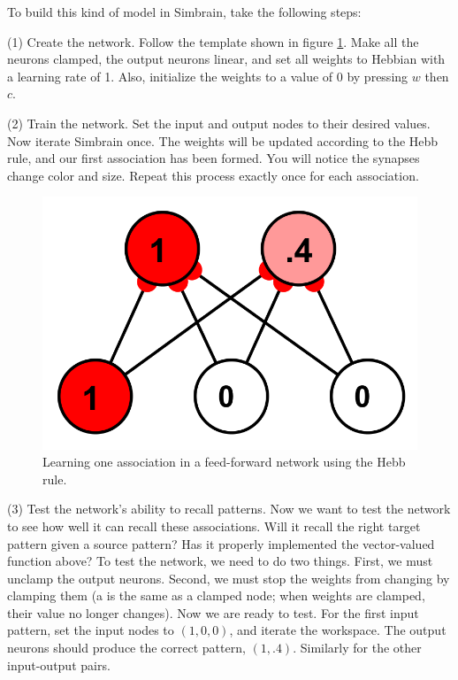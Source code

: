 To build this kind of model in Simbrain, take the following steps:

(1) Create the network. Follow the template shown in figure \ref{ffAssociator}. Make all the neurons clamped, the output neurons linear, and set all weights to Hebbian with a learning rate of 1. Also, initialize the weights to a value of 0 by pressing $w$ then $c$. 

(2) Train the network. Set the input and output nodes to their desired values. Now iterate Simbrain once. The weights will be updated according to the Hebb rule, and our first association has been formed. You will notice the synapses change color and size. Repeat this process exactly once for each association.

\begin{figure}[h]
\centering
\includegraphics[scale=.4]{./images/net-3-2.png}
\caption[Simbrain screenshot.]{Learning one association in a feed-forward network using the Hebb rule.}
\label{ffAssociator}
\end{figure}

(3) Test the network's ability to recall patterns.  Now we want to test the network to see how well it can recall these associations. Will it recall the right target pattern given a source pattern? Has it properly implemented the vector-valued function above?  To test the network, we need to do two things. First, we must unclamp the output neurons. Second, we must stop the weights from changing by clamping them (a  is the same as a clamped node; when weights are clamped, their value no longer changes). Now we are ready to test. For the first input pattern, set the input nodes to $(1,0,0)$, and iterate the workspace. The output neurons should produce the correct pattern, $(1, .4)$. Similarly for the other input-output pairs.


